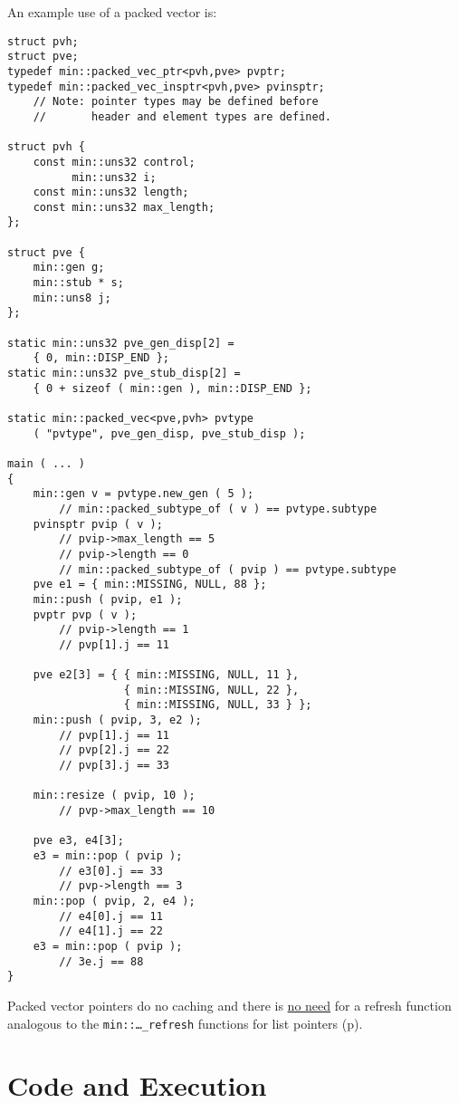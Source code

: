 \documentclass[12pt]{article}
\newcommand{\pagref}[1]{p\pageref{#1}}
\newcommand{\EOL}{\penalty \exhyphenpenalty}
\newenvironment{indpar}[1][0.3in]%
	{\begin{list}{}%
		     {\setlength{\itemsep}{0in}%
		      \setlength{\topsep}{0in}%
		      \setlength{\parsep}{1ex}%
		      \setlength{\labelwidth}{#1}%
		      \setlength{\leftmargin}{#1}%
		      \addtolength{\leftmargin}{\labelsep}}%
	 \item}%
	{\end{list}}
\begin{document}
An example use of a packed vector is:
\begin{indpar}\begin{verbatim}
struct pvh;
struct pve;
typedef min::packed_vec_ptr<pvh,pve> pvptr;
typedef min::packed_vec_insptr<pvh,pve> pvinsptr;
    // Note: pointer types may be defined before
    //       header and element types are defined.

struct pvh {
    const min::uns32 control;
          min::uns32 i;
    const min::uns32 length;
    const min::uns32 max_length;
};

struct pve {
    min::gen g;
    min::stub * s;
    min::uns8 j;
};

static min::uns32 pve_gen_disp[2] =
    { 0, min::DISP_END };
static min::uns32 pve_stub_disp[2] =
    { 0 + sizeof ( min::gen ), min::DISP_END };

static min::packed_vec<pve,pvh> pvtype
    ( "pvtype", pve_gen_disp, pve_stub_disp );

main ( ... )
{
    min::gen v = pvtype.new_gen ( 5 );
        // min::packed_subtype_of ( v ) == pvtype.subtype
    pvinsptr pvip ( v );
        // pvip->max_length == 5
        // pvip->length == 0
        // min::packed_subtype_of ( pvip ) == pvtype.subtype
    pve e1 = { min::MISSING, NULL, 88 };
    min::push ( pvip, e1 );
    pvptr pvp ( v );
        // pvip->length == 1
        // pvp[1].j == 11

    pve e2[3] = { { min::MISSING, NULL, 11 },
                  { min::MISSING, NULL, 22 },
                  { min::MISSING, NULL, 33 } };
    min::push ( pvip, 3, e2 );
        // pvp[1].j == 11
        // pvp[2].j == 22
        // pvp[3].j == 33

    min::resize ( pvip, 10 );
        // pvp->max_length == 10

    pve e3, e4[3];
    e3 = min::pop ( pvip );
        // e3[0].j == 33
        // pvp->length == 3
    min::pop ( pvip, 2, e4 );
        // e4[0].j == 11
        // e4[1].j == 22
    e3 = min::pop ( pvip );
        // 3e.j == 88
}
\end{verbatim}\end{indpar}

Packed vector pointers do no caching and
there is \underline{no need} for
a refresh function analogous to the {\tt min::\EOL \ldots\_\EOL refresh}
functions for list pointers (\pagref{LIST-POINTER-CACHE}).


\section{Code and Execution}
\end{document}
